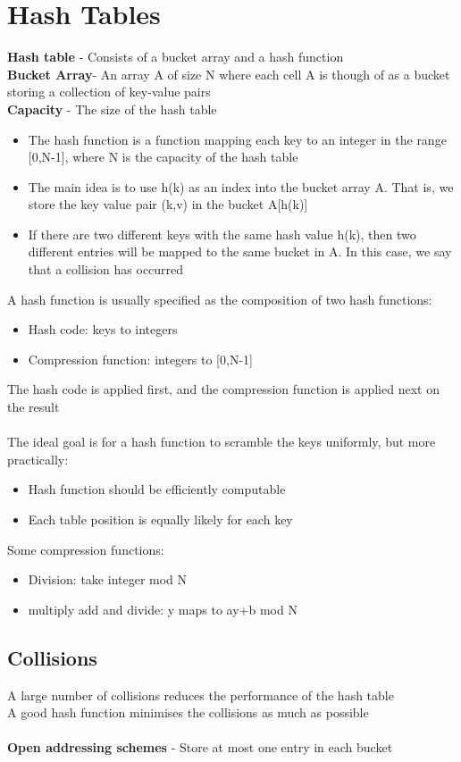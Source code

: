 \documentclass{article}[18pt]
\begin{document}
\section{Hash Tables}
\textbf{Hash table} - Consists of a bucket array and a hash function\\
\textbf{Bucket Array}- An array A of size N where each cell A is though of as a bucket storing a collection of key-value pairs\\
\textbf{Capacity} - The size of the hash table
\begin{itemize}
	\item The hash function is a function mapping each key to an integer in the range [0,N-1], where N is the capacity of the hash table
	\item The main idea is to use h(k) as an index into the bucket array A. That is, we store the key value pair (k,v) in the bucket A[h(k)]
	\item If there are two different keys with the same hash value h(k), then two different entries will be mapped to the same bucket in A. In this case, we say that a collision has occurred
\end{itemize}
A hash function is usually specified as the composition of two hash functions:
\begin{itemize}
	\item Hash code: keys to integers
	\item Compression function: integers to [0,N-1]
\end{itemize}
The hash code is applied first, and the compression function is applied next on the result\\
\\
The ideal goal is for a hash function to scramble the keys uniformly, but more practically:
\begin{itemize}
	\item Hash function should be efficiently computable
	\item Each table position is equally likely for each key
\end{itemize}
Some compression functions:
\begin{itemize}
	\item Division: take integer mod N
	\item multiply add and divide: y maps to ay+b mod N
\end{itemize}
\subsection{Collisions}
A large number of collisions reduces the performance of the hash table\\
A good hash function minimises the collisions as much as possible\\
\\
\textbf{Open addressing schemes} - Store at most one entry in each bucket
\end{document}
